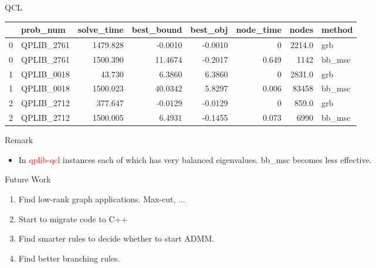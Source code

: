 \documentclass[aspectratio=1610, 9pt]{beamer}
\newcommand{\redsf}[1]{\textcolor{red}{\textsf{#1}}}
\begin{document}
\begin{frame}[standout]{QCL}
  \begin{table}
    \begin{tabular}{llrrrrrl}
      \toprule
      {} & prob\_num   & solve\_time & best\_bound & best\_obj & node\_time & nodes  & method  \\
      \midrule
      0  & QPLIB\_2761 & 1479.828    & -0.0010     & -0.0010   & 0          & 2214.0 & grb     \\
      0  & QPLIB\_2761 & 1500.390    & 11.4674     & -0.2017   & 0.649      & 1142   & bb\_msc \\
      1  & QPLIB\_0018 & 43.730      & 6.3860      & 6.3860    & 0          & 2831.0 & grb     \\
      1  & QPLIB\_0018 & 1500.023    & 40.0342     & 5.8297    & 0.006      & 83458  & bb\_msc \\
      2  & QPLIB\_2712 & 377.647     & -0.0129     & -0.0129   & 0          & 859.0  & grb     \\
      2  & QPLIB\_2712 & 1500.005    & 6.4931      & -0.1455   & 0.073      & 6990   & bb\_msc \\
      \bottomrule
    \end{tabular}
  \end{table}

  Remark
  \begin{itemize}
    \item In \redsf{qplib-qcl} instances each of which has very balanced eigenvalues. bb\_msc becomes less effective.
  \end{itemize}
\end{frame}


\setlength\pdfpagewidth{16.00cm}%
\setlength\pdfpageheight{10.00cm}%

\begin{frame}[allowframebreaks]{Future Work}
  \begin{enumerate}
    \item Find low-rank graph applications. Max-cut, ...
    \item Start to migrate code to C++
    \item Find smarter rules to decide whether to start ADMM.
    \item Find better branching rules.
  \end{enumerate}
\end{frame}
\end{document}

